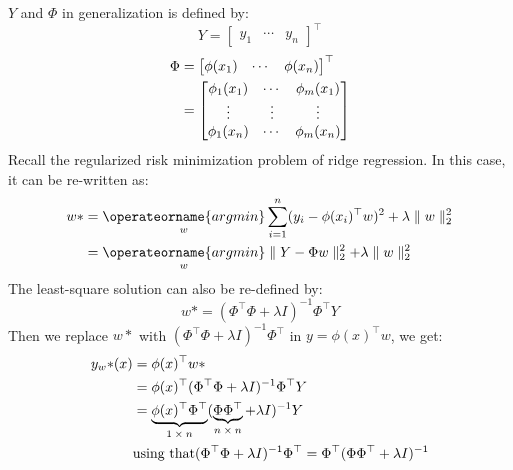 $Y$ and $\Phi$ in generalization is defined by:
\begin{equation}
    Y=\begin{bmatrix}
         y_1&\cdots&y_n
      \end{bmatrix}^\top 
\end{equation}
\begin{align}
    \Phi&=\begin{bmatrix}
           \phi(x_1)&\cdots&\phi(x_n) 
          \end{bmatrix}^\top \notag\\
        &=\begin{bmatrix}
           \phi_1(x_1)&\cdots&\phi_m(x_1)\\
           \vdots&\vdots&\vdots \\
           \phi_1(x_n)&\cdots&\phi_m(x_n)
          \end{bmatrix}
\end{align}
Recall the regularized risk minimization problem of ridge regression. In this case, it can be re-written as:
\begin{align*}
    w{*}&=\underset{w}{\operateorname{argmin}}\sum_{i=1}^n(y_i-\phi(x_i)^\top w)^2+\lambda\parallel w \parallel_2^2\\
      &=\underset{w}{\operateorname{argmin}}\parallel Y-\Phi w\parallel_2^2+\lambda\parallel w\parallel_2^2
\end{align*}
The least-square solution can also be re-defined by:
\begin{equation}
    w{*}=(\Phi^\top\Phi+\lambda I)^{-1}\Phi^\top Y
\end{equation}
Then we replace $w{*}$ with $(\Phi^\top \Phi+\lambda I)^{-1}\Phi^\top$ in $y=\phi(x)^\top w$, we get:
\begin{align}
    y_w{*} (x)&=\phi(x)^\top w{*}\notag\\
            &=\phi(x)^\top(\Phi^\top \Phi+\lambda I)^{-1}\Phi^\top Y\notag\\
            &=\underbrace{\phi(x)^\top \Phi^\top}_\text{$1\times n$}(\underbrace{\Phi\Phi^\top}_\text{$n\times n$}+\lambda I)^{-1}Y\\
            &\text{using that} (\Phi^\top \Phi+\lambda I)^{-1}\Phi^\top=\Phi^\top(\Phi\Phi^\top+\lambda I)^{-1}\notag
\end{align}


